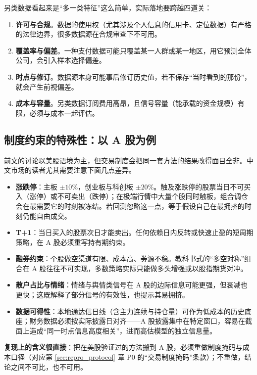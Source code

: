 另类数据看起来是“多一类特征”这么简单，实际落地要跨越四道关：

\begin{enumerate}
  \item \textbf{许可与合规}。数据的使用权（尤其涉及个人信息的信用卡、定位数据）有严格的法律边界，很多数据源在合规审查下不可用。
  \item \textbf{覆盖率与偏差}。一种支付数据可能只覆盖某一人群或某一地区，用它预测全体公司，会引入样本选择偏差。
  \item \textbf{时点与修订}。数据源本身可能事后修订历史值，若不保存“当时看到的那份”，就会产生前视偏差。
  \item \textbf{成本与容量}。另类数据订阅费用高昂，且信号容量（能承载的资金规模）有限，必须与成本一起评估。
\end{enumerate}

\subsection{制度约束的特殊性：以 A 股为例}\label{sec:china}

前文的讨论以美股语境为主，但交易制度会把同一套方法的结果改得面目全非。中文市场的读者尤其需要注意下面几点差异。

\begin{itemize}
  \item \textbf{涨跌停}：主板 $\pm10\%$，创业板与科创板 $\pm20\%$。触及涨跌停的股票当日不可买入（涨停）或不可卖出（跌停）；在极端行情中大量个股同时触板，组合调仓会在最需要它的时刻被冻结。若回测忽略这一点，等于假设自己在最拥挤的时刻仍能自由成交。
  \item \textbf{T+1}：当日买入的股票次日才能卖出。任何依赖日内反转或快速止盈的短周期策略，在 A 股必须重写持有期约束。
  \item \textbf{融券约束}：个股做空渠道有限、成本高、券源不稳。教科书式的“多空对称”组合在 A 股往往不可实现，多数策略实际只能做多头增强或以股指期货对冲。
  \item \textbf{散户占比与情绪}：情绪与舆情类信号在 A 股的边际信息可能更强，但衰减也更快；这既解释了部分信号的有效性，也提示其易拥挤。
  \item \textbf{数据可得性}：本地通达信日线（含主力连续与持仓量）可作为低成本的历史底座；财务数据必须按实际披露日对齐——A 股披露集中在特定窗口，容易在截面上造成“同一时点信息高度相关”，进而高估模型的独立信息量。
\end{itemize}

\textbf{复现上的含义很直接}：把在美股验证过的方法搬到 A 股，必须重做制度掩码与成本口径（对应第 \ref{sec:repro_protocol} 章 P0 的“交易制度掩码”条款）；不重做，结论之间不可比，也不可用。

